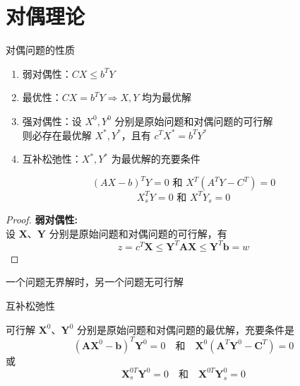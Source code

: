\documentclass[12pt, a4paper, oneside, UTF8]{ctexbook}
\begin{document}
% 
\else
\fi

\chapter{对偶理论}

\begin{theorem}
    对偶问题的性质

    \begin{enumerate}
        \item 弱对偶性：\( CX \leq b^TY \)
        \item 最优性：\( CX = b^TY \Rightarrow X, Y\) 均为最优解
        \item 强对偶性：设 \( X^0, Y^0 \) 分别是原始问题和对偶问题的可行解\\
        则必存在最优解 \( X^*, Y^* \)，且有 \( c^TX^* = b^TY^* \)
        \item 互补松弛性：\( X^*, Y^* \) 为最优解的充要条件
    \end{enumerate}

\[
(A X - b)^T Y = 0 \text{ 和 } X^T (A^T Y - C^T) = 0
\]
\[
X_s^T Y = 0 \text{ 和 } X^T Y_s = 0
\]
\end{theorem}

\begin{proof}
    \textbf{弱对偶性:\\}
    设 \( \mathbf{X} \)、\( \mathbf{Y} \) 分别是原始问题和对偶问题的可行解，有
\[ z = c^T \mathbf{X} \leq \mathbf{Y}^T \mathbf{A} \mathbf{X} \leq \mathbf{Y}^T  \mathbf{b} = w \]
\end{proof}

\begin{remark}
    一个问题无界解时，另一个问题无可行解
\end{remark}

互补松弛性

可行解 \( \mathbf{X}^0 \)、\( \mathbf{Y}^0 \) 分别是原始问题和对偶问题的最优解，充要条件是
\[
(\mathbf{A}\mathbf{X}^0 - \mathbf{b})^T \mathbf{Y}^0 = 0 \quad \text{和} \quad \mathbf{X}^0 (\mathbf{A}^T \mathbf{Y}^0 - \mathbf{C}^T) = 0
\]
或
\[
\mathbf{X}_s^{0T} \mathbf{Y}^0 = 0 \quad \text{和} \quad \mathbf{X}^{0T} \mathbf{Y}_s^0 = 0
\]
\end{document}
